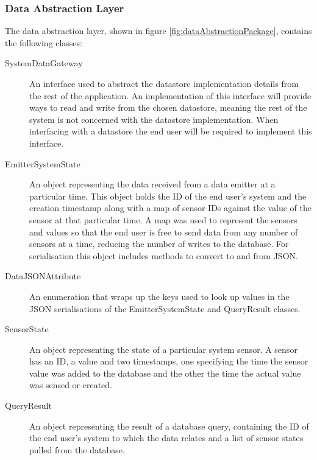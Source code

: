 \documentclass[10pt,a4paper]{article}
\begin{document}
\subsubsection{Data Abstraction Layer}

The data abstraction layer, shown in figure
\ref{fig:dataAbstractionPackage}, contains the following classes:

\begin{description}
  \item [SystemDataGateway] An interface used to abstract the
    datastore implementation details from the rest of the
    application. An implementation of this interface will provide ways
    to read and write from the chosen datastore, meaning the rest of the
    system is not concerned with the datastore implementation. When
    interfacing with a datastore the end user will be required to
    implement this interface.

  \item [EmitterSystemState] An object representing the data received
    from a data emitter at a particular time. This object holds
    the ID of the end user's system and the creation timestamp along
    with a map of sensor IDs against the value of the sensor at that
    particular time. A map was used to represent the sensors and
    values so that the end user is free to send data from any number of 
    sensors at a time, reducing the number of writes to the
    database. For serialisation this object includes methods to
    convert to and from JSON.

  \item [DataJSONAttribute] An enumeration that wraps up the keys used
    to look up values in the JSON serialisations of the
    EmitterSystemState and QueryResult classes.

  \item [SensorState] An object representing the state of a particular
    system sensor. A sensor has an ID, a value and two timestamps, one
    specifying the time the sensor value was added to the database and
    the other the time the actual value was sensed or created.

  \item [QueryResult] An object representing the result of a database
    query, containing the ID of the end user's system to which the
    data relates and a list of sensor states pulled from the database.
\end{description}
\end{document}
